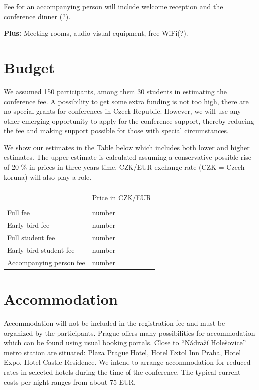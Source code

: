 \documentclass[12pt]{extarticle}
\begin{document}
Fee for an accompanying person will include welcome reception and the conference dinner (?).

{\bf Plus:} Meeting rooms,  audio visual equipment,  free WiFi(?).


\section*{Budget}
\noindent
We assumed 150 participants, among them 30 students in estimating the conference fee.
A possibility to  get some extra funding is not too high, there are no special grants for conferences
in Czech Republic. However, we will use any other emerging opportunity to apply for the conference
support, thereby reducing the fee and making support possible for those with special circumstances.

We show our estimates in the Table below which includes both lower and higher estimates. The upper
estimate is calculated assuming a conservative possible rise of 20 \% in prices in three years time.  
CZK/EUR exchange rate (CZK = Czech koruna) will also play a role.

\begin{table}[h]
\centering
\begin{tabular}{ll}
\hline \\[-1mm]
 &   Price in CZK/EUR  \\[1mm]
\hline \\[-1mm]
 Full fee &  number \\[1mm]
 Early-bird fee & number  \\[1mm]
 Full student fee &  number \\[1mm]
 Early-bird student fee & number  \\[1mm]
 Accompanying person fee & number  \\[1mm]
\hline
\end{tabular}
\end{table}

\section*{Accommodation}
\noindent
Accommodation will not be included in the registration fee and must be organized by the participants.
Prague offers many possibilities for accommodation which can be found using usual booking portals. Close
to “Nádraží Holešovice” metro station are situated: Plaza Prague Hotel, Hotel Extol Inn Praha, Hotel Expo, Hotel
Castle Residence. We intend to arrange accommodation for reduced rates in selected hotels during the time of
the conference. The typical current costs per night ranges from about 75 EUR.
\end{document}
